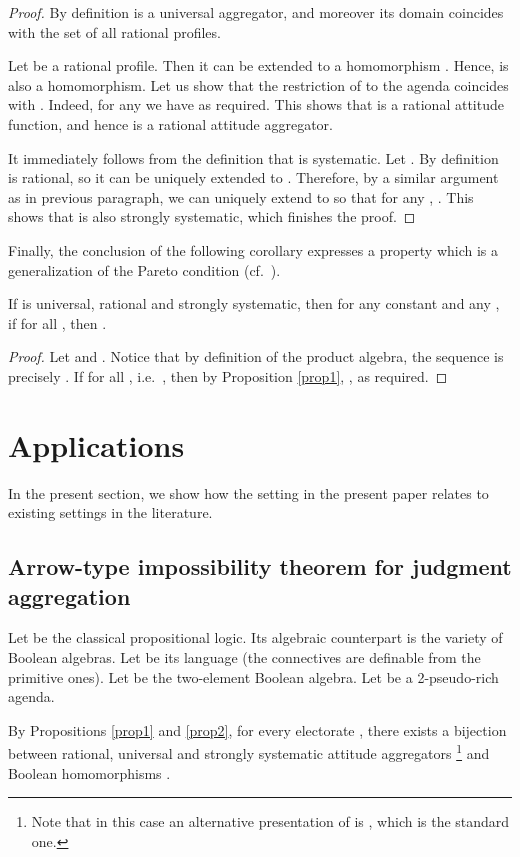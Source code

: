 \documentclass{llncs}
\numberwithin{equation}{section}
\begin{document}
\begin{proof}
By definition  is a universal aggregator, and moreover its domain coincides with the set of all rational profiles.

Let  be a rational profile. Then it can be extended to a homomorphism . Hence,  is also a homomorphism. Let us show that the restriction of  to the agenda  coincides with . Indeed, for any  we have  as required. This shows that  is a rational attitude function, and hence  is a rational attitude aggregator.

It immediately follows from the definition that  is systematic. Let . By definition  is rational, so it can be uniquely extended to . Therefore, by a similar argument as in previous paragraph, we can uniquely extend  to  so that for any , . This shows that  is also strongly systematic, which finishes the proof.
\end{proof}
Finally, the conclusion of the following corollary expresses a property which is a generalization of the Pareto condition (cf.\ \cite[Definition 3.7]{He13}).

\begin{corollary}
If  is universal, rational and strongly systematic, then for any constant  and any , if  for all , then .
\end{corollary}
\begin{proof}
Let  and .
Notice that by definition of the product algebra, the sequence  is precisely .
If  for all , i.e.\ ,
then by Proposition \ref{prop1},
, as required.\end{proof}

\section{Applications}
\label{Sec:Arrow}
In the present section, we show how the setting in the present paper relates to existing settings in the literature. \subsection{Arrow-type impossibility theorem for judgment aggregation}
Let  be the classical propositional logic. Its algebraic counterpart  is the variety of Boolean algebras. Let  be its language (the connectives  are definable from the primitive ones). Let  be the two-element Boolean algebra. Let  be a 2-pseudo-rich agenda.

By Propositions \ref{prop1} and \ref{prop2}, for every electorate , there exists a bijection between rational, universal and strongly systematic attitude aggregators 
\footnote{Note that in this case an alternative presentation of  is , which is the standard one.}
and Boolean homomorphisms .
\end{document}
